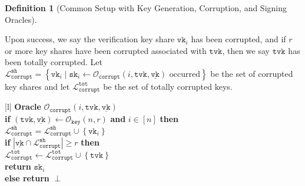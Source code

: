 \documentclass[11pt]{article}
\theoremstyle{definition}
\newtheorem{definition}[definition]{Definition}
\newcommand{\sk}{\texttt{sk}}
\newcommand{\vk}{\texttt{vk}}
\newcommand{\lt}{\texttt{lt}}
\newcommand{\tvk}{\texttt{tvk}}
\newcommand{\VK}{\underline{\texttt{vk}}}
\newcommand{\LT}{\underline{\texttt{lt}}}
\newcommand{\corruptionOracle}{\mathcal{O}_{\texttt{corrupt}}}
\newcommand{\keyOracle}{\mathcal{O}_{\texttt{key}}}
\newcommand{\corruptedTotalKeys}{\mathcal{L}_{\texttt{corrupt}}^{\texttt{tot}}}
\newcommand{\corruptedKeyShareSet}{\mathcal{L}_{\texttt{corrupt}}^{\texttt{sh}}}
\newcommand{\lar}{\leftarrow}
\begin{document}
\begin{definition}[Common Setup with Key Generation, Corruption, and Signing Oracles]
\begin{enumerate}
\begin{enumerate}
Upon success, we say the verification key share $\vk_i$ has been corrupted, and if $r$ or more key shares have been corrupted associated with $\tvk$, then we say $\tvk$ has been totally corrupted. Let $\corruptedKeyShareSet = \left\{\vk_i \mid \sk_i \leftarrow \corruptionOracle(i, \tvk, \VK)\text{ occurred}\right\}$ be the set of corrupted key shares and let $\corruptedTotalKeys$ be the set of totally corrupted keys.




\begin{oracle}
    \centering
        \begin{tabular}{|l|}
        \hline
          {\textbf{Oracle} $\corruptionOracle(i, \tvk, \VK)$} \\
        \hline 
        \textbf{if} $(\tvk, \VK) \lar \keyOracle(n,r)$\textbf{ and }$i \in [n]$\textbf{ then } \\ 
        \quad \quad $\corruptedKeyShareSet = \corruptedKeyShareSet \cup \left\{\vk_i\right\}$ \\ 
        \quad \quad \textbf{if} $|\VK \cap \corruptedKeyShareSet| \geq r$  
        \textbf{then}\\
        \quad \quad \quad \quad $\corruptedTotalKeys \lar \corruptedTotalKeys \cup \left\{\tvk\right\}$ \\
        \quad \quad \textbf{return} $\sk_i$ \\
        \textbf{else return} $\perp$ \\
        

\end{tabular}
\end{oracle}
\end{enumerate}
\end{enumerate}
\end{definition}
\end{document}
